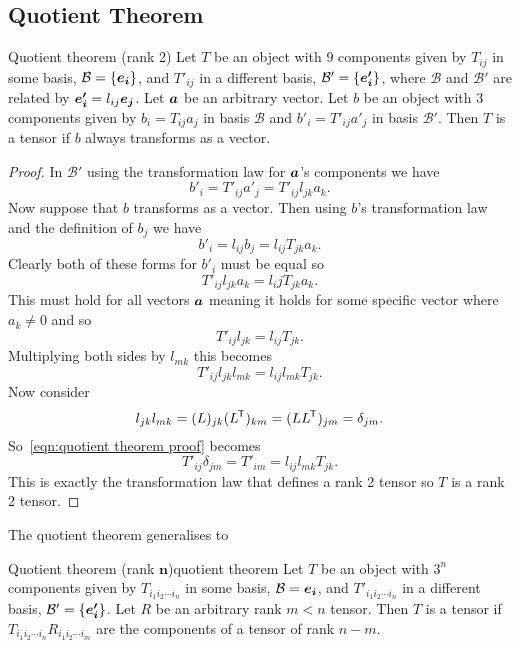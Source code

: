 \documentclass[a4paper]{article}
\newcommand{\basis}{\mathcal{B}}
\newcommand{\veprime}[1]{\vv{e'_{#1}}}
\newcommand{\nindices}[2]{{ {#1}_1 {#1}_2 \dotsm {#1}_{#2} }}
\begin{document}
    \subsection{Quotient Theorem}
    \begin{theorem}{Quotient theorem (rank 2)}{}
        Let \(T\) be an object with 9 components given by \(T_{ij}\) in some basis, \(\basis = \{\ve{i}\}\), and \(T'_{ij}\) in a different basis, \(\basis' = \{\veprime{i}\}\), where \(\basis\)  and \(\basis'\) are related by \(\veprime{i} = l_{ij}\ve{j}\).
        Let \(\bm{a}\) be an arbitrary vector.
        Let \(b\) be an object with \(3\) components given by \(b_i = T_{ij}a_j\) in basis \(\basis\) and \(b'_i = T'_{ij}a'_j\) in basis \(\basis'\).
        Then \(T\) is a tensor if \(b\) always transforms as a vector.
    \end{theorem}
    \begin{proof}
        In \(\basis'\) using the transformation law for \(\bm{a}\)'s components we have
        \[b'_{i} = T'_{ij}a'_j = T'_{ij}l_{jk}a_k.\]
        Now suppose that \(b\) transforms as a vector.
        Then using \(b\)'s transformation law and the definition of \(b_j\) we have
        \[b'_i = l_{ij}b_j = l_{ij}T_{jk}a_k.\]
        Clearly both of these forms for \(b'_i\) must be equal so
        \[T'_{ij}l_{jk}a_k = l_ijT_{jk}a_k.\]
        This must hold for all vectors \(\bm{a}\) meaning it holds for some specific vector where \(a_k \ne 0\) and so
        \[T'_{ij}l_{jk} = l_{ij}T_{jk}.\]
        Multiplying both sides by \(l_{mk}\) this becomes
        \begin{equation}\label{eqn:quotient theorem proof}
            T'_{ij}l_{jk}l_{mk} = l_{ij}l_{mk}T_{jk}.
        \end{equation}
        Now consider
        \[l_{jk}l_{mk} = (L)_{jk}(L^{\mkern-1.5mu\mathsf{T}})_{km} = (LL^{\mkern-1.5mu\mathsf{T}})_{jm} = \delta_{jm}.\]
        So~\ref{eqn:quotient theorem proof} becomes
        \[T'_{ij}\delta_{jm} = T'_{im} = l_{ij}l_{mk}T_{jk}.\]
        This is exactly the transformation law that defines a rank 2 tensor so \(T\) is a rank 2 tensor.
    \end{proof}
    
    The quotient theorem generalises to
    \begin{theorem}{Quotient theorem (rank \(\bm{n}\))}{quotient theorem}
        Let \(T\) be an object with \(3^n\) components given by \(T_{\nindices{i}{n}}\) in some basis, \(\basis = {\ve{i}}\), and \(T'_{\nindices{i}{n}}\) in a different basis, \(\basis' = \{\veprime{i}\}\).
        Let \(R\) be an arbitrary rank \(m < n\) tensor.
        Then \(T\) is a tensor if \(T_{\nindices{i}{n}}R_{\nindices{i}{m}}\) are the components of a tensor of rank \(n - m\).
    \end{theorem}
    
\end{document}
